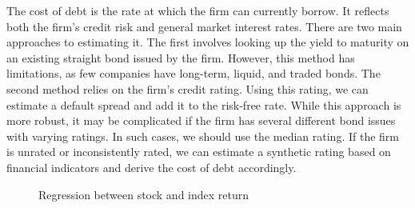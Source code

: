 The cost of debt is the rate at which the firm can currently borrow. It reflects both the firm’s credit risk and general market interest rates. There are two main approaches to estimating it. The first involves looking up the yield to maturity on an existing straight bond issued by the firm. However, this method has limitations, as few companies have long-term, liquid, and traded bonds. The second method relies on the firm’s credit rating. Using this rating, we can estimate a default spread and add it to the risk-free rate. While this approach is more robust, it may be complicated if the firm has several different bond issues with varying ratings. In such cases, we should use the median rating. If the firm is unrated or inconsistently rated, we can estimate a synthetic rating based on financial indicators and derive the cost of debt accordingly.








\begin{figure}[h!]
\centering
{}
\caption{Regression between stock and index return}
\end{figure}
